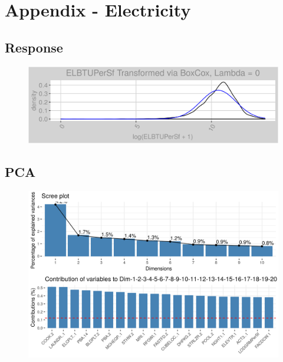 
\section{Appendix - Electricity}
\label{sec:appendix_elec}
\appendix
\subsection{Response}
\label{appendix:electricity:response}
\begin{figure}[h]
\centering
\includegraphics[width=\textwidth, height=0.3\textheight]{Images/electricity_psf_response.png}
\end{figure}
\subsection{PCA}
\label{appendix:electricity:pca}
\begin{figure}[h]
\centering
\includegraphics[width=\textwidth, height=0.3\textheight]{Images/electricity_psf_pca_vars.png}
\end{figure}
\FloatBarrier
\newpage
